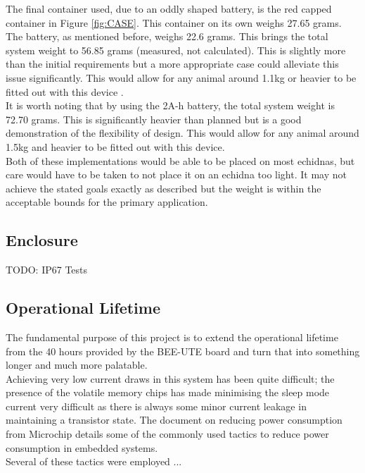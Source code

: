 \documentclass[12pt,openany,a4paper]{book}
\begin{document}
		The final container used, due to an oddly shaped battery, is the red capped container in Figure \ref{fig:CASE}. This container on its own weighs 27.65 grams. \\
		
		The battery, as mentioned before, weighs 22.6 grams. This brings the total system weight to 56.85 grams (measured, not calculated). This is slightly more than the initial requirements but a more appropriate case could alleviate this issue significantly. This would allow for any animal around 1.1kg or heavier to be fitted out with this device \cite{Mamm87}. \\
		
		It is worth noting that by using the 2A-h battery, the total system weight is 72.70 grams. This is significantly heavier than planned but is a good demonstration of the flexibility of design. This would allow for any animal around 1.5kg and heavier to be fitted out with this device. \\
		
		Both of these implementations would be able to be placed on most echidnas, but care would have to be taken to not place it on an echidna too light. It may not achieve the stated goals exactly as described but the weight is within the acceptable bounds for the primary application.
		\subsection{Enclosure}
		TODO: IP67 Tests
		\subsection{Operational Lifetime}
		
		The fundamental purpose of this project is to extend the operational lifetime from the 40 hours provided by the BEE-UTE board \cite{Freakley13} and turn that into something longer and much more palatable. \\
		
		Achieving very low current draws in this system has been quite difficult; the presence of the volatile memory chips has made minimising the sleep mode current very difficult as there is always some minor current leakage in maintaining a transistor state. The document on reducing power consumption from Microchip \cite{PICPWR} details some of the commonly used tactics to reduce power consumption in embedded systems. \\
		
		Several of these tactics were employed ...
		
\end{document}
